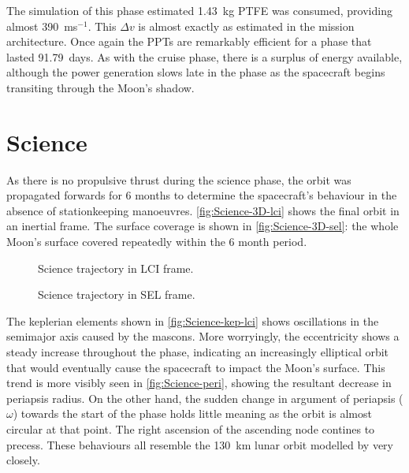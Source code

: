The simulation of this phase estimated 1.43~kg PTFE was consumed, providing almost 390~ms$^{-1}$. This $\Delta v$ is almost exactly as estimated in the mission architecture. Once again the PPTs are remarkably efficient for a phase that lasted 91.79~days. As with the cruise phase, there is a surplus of energy available, although the power generation slows late in the phase as the spacecraft begins transiting through the Moon's shadow.


\clearpage


\section{Science} \label{sec:Science}

As there is no propulsive thrust during the science phase, the orbit was propagated forwards for 6 months to determine the spacecraft's behaviour in the absence of stationkeeping manoeuvres. \autoref{fig:Science-3D-lci} shows the final orbit in an inertial frame. The surface coverage is shown in \autoref{fig:Science-3D-sel}: the whole Moon's surface covered repeatedly within the 6 month period. 

\begin{figure}
\centering
\def\svgwidth{\figurewidth}

\caption{Science trajectory in LCI frame.} \label{fig:Science-3D-lci}
\end{figure}

\begin{figure}
\centering
\def\svgwidth{\figurewidth}

\caption{Science trajectory in SEL frame.} \label{fig:Science-3D-sel}
\end{figure}

The keplerian elements shown in \autoref{fig:Science-kep-lci} shows oscillations in the semimajor axis caused by the mascons. More worryingly, the eccentricity shows a steady increase throughout the phase, indicating an increasingly elliptical orbit that would eventually cause the spacecraft to impact the Moon's surface. This trend is more visibly seen in \autoref{fig:Science-peri}, showing the resultant decrease in periapsis radius. On the other hand, the sudden change in argument of periapsis ($\omega$) towards the start of the phase holds little meaning as the orbit is almost circular at that point. The right ascension of the ascending node contines to precess. These behaviours all resemble the 130~km lunar orbit modelled by \textcite{Gupta2011} very closely.

